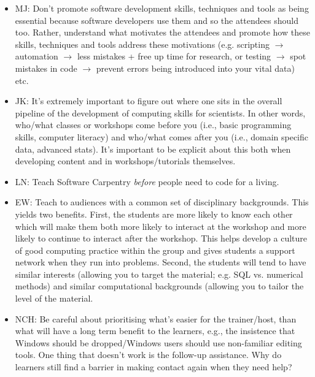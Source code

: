 \documentclass{article}
\begin{document}
\begin{itemize}
\begin{itemize}
    \end{itemize}

  \item MJ: Don't promote software development skills, techniques and
    tools as being essential because software developers use them and
    so the attendees should too. Rather, understand what motivates the
    attendees and promote how these skills, techniques and tools
    address these motivations (e.g. scripting $\rightarrow$ automation
    $\rightarrow$ less mistakes + free up time for research, or
    testing $\rightarrow$ spot mistakes in code $\rightarrow$ prevent
    errors being introduced into your vital data) etc.

  \item JK: It's extremely important to figure out where one sits in
    the overall pipeline of the development of computing skills for
    scientists. In other words, who/what classes or workshops come
    before you (i.e., basic programming skills, computer literacy) and
    who/what comes after you (i.e., domain specific data, advanced
    stats). It's important to be explicit about this both when
    developing content and in workshops/tutorials themselves.

  \item LN: Teach Software Carpentry \emph{before} people need to code
    for a living.

  \item EW: Teach to audiences with a common set of disciplinary
    backgrounds. This yields two benefits. First, the students are
    more likely to know each other which will make them both more
    likely to interact at the workshop and more likely to continue to
    interact after the workshop. This helps develop a culture of good
    computing practice within the group and gives students a support
    network when they run into problems. Second, the students will
    tend to have similar interests (allowing you to target the
    material; e.g. SQL vs. numerical methods) and similar
    computational backgrounds (allowing you to tailor the level of the
    material.

  \item NCH: Be careful about prioritising what's easier for the
    trainer/host, than what will have a long term benefit to the
    learners, e.g., the insistence that Windows should be
    dropped/Windows users should use non-familiar editing tools.  One
    thing that doesn't work is the follow-up assistance. Why do
    learners still find a barrier in making contact again when they
    need help?


\end{itemize}
\end{document}
